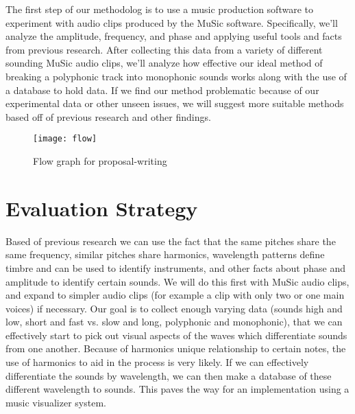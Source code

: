 \documentclass[11pt]{article}
\begin{document}

The first step of our methodolog is to use a music production software to experiment with audio clips produced by the MuSic software. Specifically, we'll analyze the amplitude, frequency, and phase and applying useful tools and facts from previous research. After collecting this data from a variety of different sounding MuSic audio clips, we’ll analyze how effective our ideal method of breaking a polyphonic track into monophonic sounds works along with the use of a database to hold data. If we find our method problematic because of our experimental data or other unseen issues, we will suggest more suitable methods based off of previous research and other findings.

\begin{figure}[htbp]
\centering
\texttt{[image: flow]}
\caption{Flow graph for proposal-writing}
\label{intro-fig1}
\end{figure}

\vspace*{-.2in}
\section{Evaluation Strategy}
\label{sec:evaluate}
\vspace*{-.1in}


Based of previous research we can use the fact that the same pitches share the same frequency, similar pitches share harmonics, wavelength patterns define timbre and can be used to identify instruments, and other facts about phase and amplitude to identify certain sounds. We will do this first with MuSic audio clips, and expand to simpler audio clips (for example a clip with only two or one main voices) if necessary. Our goal is to collect enough varying data (sounds high and low, short and fast vs. slow and long, polyphonic and monophonic), that we can effectively start to pick out visual aspects of the waves which differentiate sounds from one another. Because of harmonics unique relationship to certain notes, the use of harmonics to aid in the process is very likely. If we can effectively differentiate the sounds by wavelength, we can then make a database of these different wavelength to sounds. This paves the way for an implementation using a music visualizer system.
\end{document}
